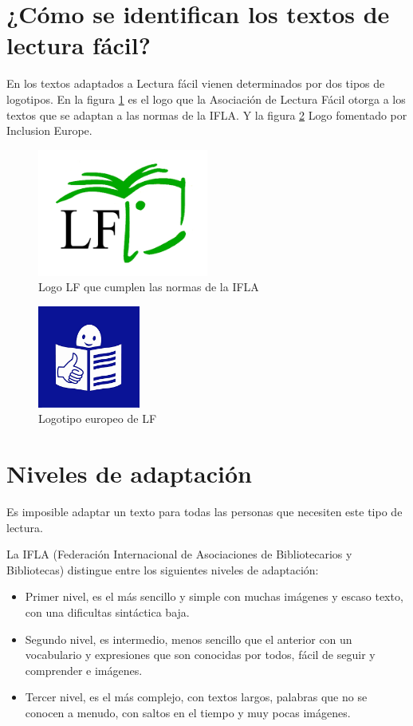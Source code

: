\section{¿Cómo se identifican los textos de lectura fácil?}
En los textos adaptados a Lectura fácil vienen determinados por dos tipos de logotipos. En la figura \ref{fig:IFLA} es el logo que la Asociación de Lectura Fácil otorga a los textos que se adaptan a las normas de la IFLA. Y la figura  \ref{fig:logoEuropeo}
Logo fomentado por Inclusion Europe.
\begin{figure}[htb]
\centering
	\includegraphics[width=0.5\textwidth]{Imagenes/Logos/indice}
	\caption{Logo LF que cumplen las normas de la IFLA}
	\label{fig:IFLA}
\end{figure} 
\begin{figure}[htb]
	\centering
	\includegraphics[width=0.3\textwidth]{Imagenes/Logos/indice2}
	\caption{Logotipo europeo de LF}
	\label{fig:logoEuropeo}
\end{figure} 
\section{Niveles de adaptación}
Es imposible adaptar un texto para todas las personas que necesiten este tipo de lectura.
 
La IFLA (Federación Internacional de Asociaciones de Bibliotecarios y Bibliotecas) distingue entre los siguientes niveles de adaptación:
\begin{itemize}
	\item Primer nivel, es el más sencillo y simple con muchas imágenes y escaso texto, con una dificultas sintáctica baja.
\item Segundo nivel, es intermedio, menos sencillo que el anterior con un vocabulario y expresiones que son conocidas por todos, fácil de seguir y comprender e imágenes.
\item Tercer nivel, es el más complejo, con textos largos, palabras que no se conocen a menudo, con saltos en el tiempo y muy pocas imágenes. 
 \end{itemize}
